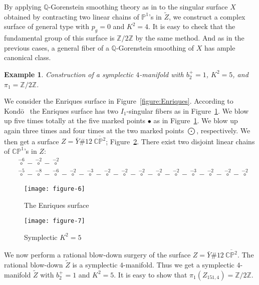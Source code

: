 \documentclass[twoside,11pt]{amsart}
\newtheorem{example}{Example}[section]
\begin{document}
By applying ${{\mathbb Q}}$-Gorenstein smoothing theory  as in \cite{LP1} to
the singular surface $X$ obtained by contracting two linear chains
of ${{\mathbb P}}^1$'s in $\tilde Z$, we construct a complex surface of
general type with $p_g=0$ and $K^2=4$. It is easy to check that
the fundamental group of this surface is ${{\mathbb Z}}/2{{\mathbb Z}}$ by the same
method. And as in the previous cases, a general fiber of a
${{\mathbb Q}}$-Gorenstein smoothing of $X$ has ample canonical class.

\begin{example} Construction of a symplectic $4$-manifold with $b_2^+=1$, $K^2=5$, and $\pi_1 =
\mathbb{Z}/2\mathbb{Z}$. \end{example}

We consider the Enriques surface in Figure~\ref{figure:Enriques}.
According to Kond\=o~\cite{Kon} the Enriques surface has two
$I_1$-singular fibers as in Figure~\ref{figure:K^2=5-Y}. We blow up
five times totally at the five marked points $\bullet$ as in
Figure~\ref{figure:K^2=5-Y}. We blow up again three times and four
times at the two marked points $\bigodot$, respectively. We then get
a surface  $Z=\bar Y\# 12\ \overline{{{\mathbb C}}{{\mathbb P}}^2}$;
Figure~\ref{figure:K^2=5-Z}. There exist two disjoint linear chains
of $\mathbb{CP}^1$'s in $Z$:
\begin{align*}
&\overset{-6}{\circ}-\overset{-2}{\circ}-\overset{-2}{\circ} \\
&\overset{-5}{\circ}-\overset{-8}{\circ}-\overset{-6}{\circ}-\overset{-2}
{\circ}-\overset{-3}{\circ}-\overset{-2}{\circ}-\overset{-2}{\circ}-\overset{-2}{\circ}
-\overset{-2}{\circ}-\overset{-2}{\circ}-\overset{-3}{\circ}-\overset{-2}{\circ}-\overset{-2}{\circ}-\overset{-2}{\circ}
\end{align*}

\begin{figure}[hbtb]
\centering
\texttt{[image: figure-6]}
\caption{The Enriques surface}
\label{figure:K^2=5-Y}
\end{figure}

\begin{figure}[hbtb]
\centering
\texttt{[image: figure-7]}
\caption{Symplectic $K^2=5$}
\label{figure:K^2=5-Z}
\end{figure}

We now perform a rational blow-down surgery of the surface $Z=\bar
Y\# 12\ \overline{{{\mathbb C}}{{\mathbb P}}^2}$. The rational blow-down $\tilde{Z}$
is a symplectic $4$-manifold. Thus we get a symplectic
$4$-manifold $\tilde{Z}$ with $b_2^+=1$ and $K^2=5$. It is easy to
show that $\pi_1(Z_{151,4})=\mathbb{Z}/2\mathbb{Z}$.
\end{document}
